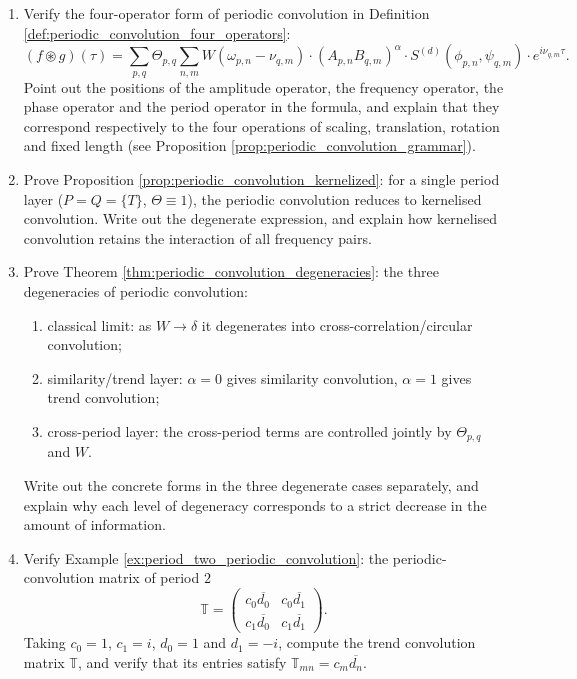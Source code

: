 \begin{enumerate}[leftmargin=3em, label=\textbf{Exercise \arabic*}]
    \item Verify the four-operator form of periodic convolution in Definition \ref{def:periodic_convolution_four_operators}:
    \[
    (f\circledast g)(\tau)
    =\sum_{p,q}\Theta_{p,q}\sum_{n,m}
    W(\omega_{p,n}-\nu_{q,m})\cdot(A_{p,n}B_{q,m})^{\alpha}
    \cdot S^{(d)}(\phi_{p,n},\psi_{q,m})\cdot e^{i\nu_{q,m}\tau}.
    \]
    Point out the positions of the amplitude operator, the frequency operator, the phase operator and the period operator in the formula,
    and explain that they correspond respectively to the four operations of scaling, translation, rotation and fixed length
    (see Proposition \ref{prop:periodic_convolution_grammar}).

    \item Prove Proposition \ref{prop:periodic_convolution_kernelized}:
    for a single period layer ($P=Q=\{T\}$, $\Theta\equiv1$),
    the periodic convolution reduces to kernelised convolution. Write out the degenerate expression,
    and explain how kernelised convolution retains the interaction of all frequency pairs.

    \item Prove Theorem \ref{thm:periodic_convolution_degeneracies}:
    the three degeneracies of periodic convolution:
    \begin{enumerate}[label=(\roman*)]
        \item classical limit: as $W\to\delta$ it degenerates into cross-correlation/circular convolution;
        \item similarity/trend layer: $\alpha=0$ gives similarity convolution, $\alpha=1$ gives trend convolution;
        \item cross-period layer: the cross-period terms are controlled jointly by $\Theta_{p,q}$ and $W$.
    \end{enumerate}
    Write out the concrete forms in the three degenerate cases separately,
    and explain why each level of degeneracy corresponds to a strict decrease in the amount of information.

    \item Verify Example \ref{ex:period_two_periodic_convolution}:
    the periodic-convolution matrix of period $2$
    \[
    \mathbb{T}=\begin{pmatrix}
    c_0\overline{d_0}&c_0\overline{d_1}\\
    c_1\overline{d_0}&c_1\overline{d_1}
    \end{pmatrix}.
    \]
    Taking $c_0=1$, $c_1=i$, $d_0=1$ and $d_1=-i$,
    compute the trend convolution matrix $\mathbb{T}$, and verify that its entries satisfy
    $\mathbb{T}_{mn}=c_m\overline{d_n}$.


\end{enumerate}
